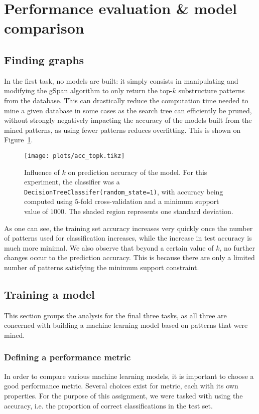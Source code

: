 \documentclass{sigkddExp}
\newcommand{\py}[1]{\texttt{#1}}
\newcommand{\gspan}{\textsf{gSpan}}
\begin{document}
\section{Performance evaluation \& model comparison}
\subsection{Finding graphs}
In the first task, no models are built: it simply consists in manipulating and modifying the \gspan{} algorithm to only return the top-\(k\) substructure patterns from the database.
This can drastically reduce the computation time needed to mine a given database in some cases as the search tree can efficiently be pruned, without strongly negatively impacting the accuracy of the models built from the mined patterns, as using fewer patterns reduces overfitting.
This is shown on Figure~\ref{fig:time_topk}.

\begin{figure}[!hbtp]
	\centering
	\texttt{[image: plots/acc\_topk.tikz]}
	\caption{Influence of \(k\) on prediction accuracy of the model.
	For this experiment, the classifier was a \py{DecisionTreeClassifer(random_state=1)}, with accuracy being computed using \(5\)-fold cross-validation and a minimum support value of \(1000\).
	The shaded region represents one standard deviation.}
	\label{fig:time_topk}
\end{figure}

As one can see, the training set accuracy increases very quickly once the number of patterns used for classification increases, while the increase in test accuracy is much more minimal.
We also observe that beyond a certain value of \(k\), no further changes occur to the prediction accuracy.
This is because there are only a limited number of patterns satisfying the minimum support constraint.

\subsection{Training a model}
This section groups the analysis for the final three tasks, as all three are concerned with building a machine learning model based on patterns that were mined.

\subsubsection{Defining a performance metric}
In order to compare various machine learning models, it is important to choose a good performance metric.
Several choices exist for metric, each with its own properties.
For the purpose of this assignment, we were tasked with using the accuracy, i.e. the proportion of correct classifications in the test set.
\end{document}
